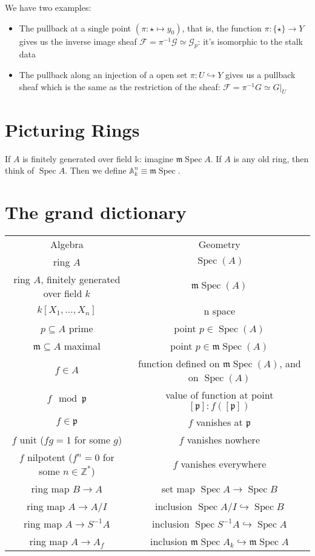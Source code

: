 \documentclass{book}
\newcommand{\F}{\ensuremath{\mathcal{F}}}
\newcommand{\G}{\ensuremath{\mathcal{G}}}
\newcommand{\Z}{\ensuremath{\mathbb{Z}}}
\newcommand{\A}{\ensuremath{\mathbb{A}}}
\newcommand{\spec}{\operatorname{Spec}}
\newcommand{\m}{\mathfrak{m}}
\newcommand{\p}{\mathfrak{p}}
\newcommand{\mspec}{\m\operatorname{Spec}}
\newcommand{\inv}{\ensuremath{-1}}
\renewcommand{\k}{\mathbb{k}} %
\theoremstyle{definition}
\begin{document}
We have two examples:
\begin{itemize}
    \item The pullback at a single point $(\pi: \star \mapsto y_0)$, 
    that is, the 
    function $\pi: \{\star\} \rightarrow Y$ gives
    us the inverse image sheaf $\F = \pi^\inv \G \simeq \G_p$: it's isomorphic
    to the stalk data
    \item The pullback along an injection of a open set $\pi: U \hookrightarrow Y$
    gives us a pullback sheaf which is the same as the
    restriction of the sheaf: $\F = \pi^\inv G \simeq G|_U$
\end{itemize}


\section{Picturing Rings}

If $A$ is finitely generated over field $\k$: imagine $\mspec A$.
If $A$ is any old ring, then think of $\spec A$. Then we define
$\A_k^n \equiv \mspec$.

\section{The grand dictionary}

\begin{tabular}{cc}
Algebra & Geometry \\
ring $A$ & $\spec(A)$ \\
ring $A$, finitely generated over field $k$ & $\mspec(A)$ \\
$k[X_1, \dots, X_n]$ & n space \\
$p \subseteq A$ prime & point $p \in \spec(A)$ \\
\(\m \subseteq A\) maximal & point \(p \in \mspec(A)\) \\
$f \in A$ &  function defined on $\mspec(A)$, and on $\spec(A)$ \\
$f \mod \p$ &  value of function  at point $[\p]: f([\p])$ \\
$f \in \p$ &  $f$ vanishes at $\p$  \\
$f$ unit ($fg = 1$ for some $g$) &  $f$ vanishes nowhere \\
$f$ nilpotent ($f^n = 0$ for some $n \in \Z^*$) &  $f$ vanishes everywhere \\
ring map $B \rightarrow A$ & set map $\spec A \rightarrow \spec B$ \\
ring map $A \rightarrow A/I$ & inclusion $\spec A/I \hookrightarrow \spec B$ \\
ring map $A \rightarrow S^\inv A$ & inclusion $\spec S^\inv A \hookrightarrow \spec A$ \\
ring map $A \rightarrow A_f$ & inclusion $\mspec A_k \hookrightarrow \mspec A$ \\
\end{tabular}
\end{document}
